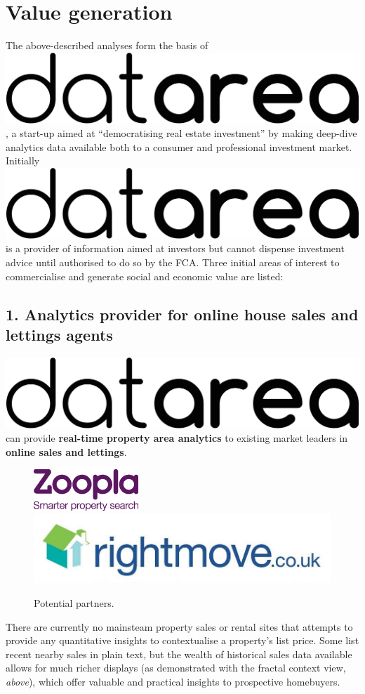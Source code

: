 \documentclass[
10pt, %
a4paper, %
oneside, %
headinclude,footinclude, %
BCOR5mm, %
]{scrartcl}
\newcommand*{\logo}{\includegraphics[scale=.04]{Figures/logotext.png}}
\begin{document}
{\let\thefootnote\relax{}}

\clearpage
\section*{Value generation}

The above-described analyses form the basis of \logo\hspace{.1em}, a
start-up aimed at ``democratising real estate investment'' by making
deep-dive analytics data available both to a consumer and professional
investment market. Initially \logo\hspace{.1em} is a provider of
information aimed at investors but cannot dispense investment advice
until authorised to do so by the FCA. Three initial areas of interest
to commercialise and generate social and economic value are listed:

\subsection*{1. Analytics provider for online house sales and lettings
agents}

\logo\hspace{.1em} can provide {\bf real-time property area analytics} to
existing market leaders in {\bf online sales and lettings}. 

\begin{figure}
\begin{center}
\includegraphics[width=.18\textwidth]{Figures/zoopla.png}
\includegraphics[width=.23\textwidth]{Figures/rightmove.jpg}
\caption*{ Potential partners. }
\end{center}
\end{figure}

There are currently no mainsteam property sales or rental sites that
attempts to provide any quantitative insights to contextualise a
property's list price. Some list recent nearby sales in plain text,
but the wealth of historical sales data available allows for much
richer displays (as demonstrated with the fractal context view,
\emph{above}), which offer valuable and practical insights to
prospective homebuyers.
\end{document}
